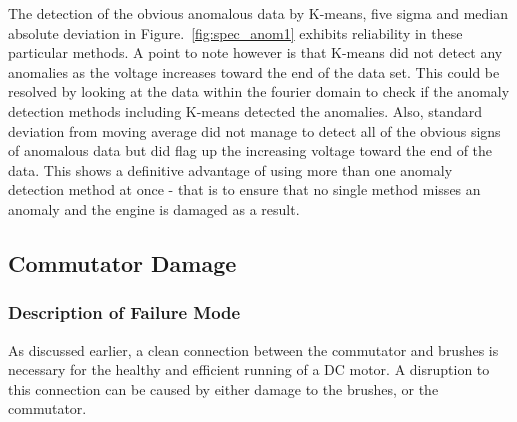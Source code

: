 The detection of the obvious anomalous data by K-means, five sigma and median absolute deviation in Figure.~\ref{fig:spec_anom1} exhibits reliability in these particular methods. A point to note however is that K-means did not detect any anomalies as the voltage increases toward the end of the data set. This could be resolved by looking at the data within the fourier domain to check if the anomaly detection methods including K-means detected the anomalies. Also, standard deviation from moving average did not manage to detect all of the obvious signs of anomalous data but did flag up the increasing voltage toward the end of the data. This shows a definitive advantage of using more than one anomaly detection method at once - that is to ensure that no single method misses an anomaly and the engine is damaged as a result.


\subsection{Commutator Damage}

\subsubsection{Description of Failure Mode}

As discussed earlier, a clean connection between the commutator and brushes is necessary for the healthy and efficient running of a DC motor. A disruption to this connection can be caused by either damage to the brushes, or the commutator. 


